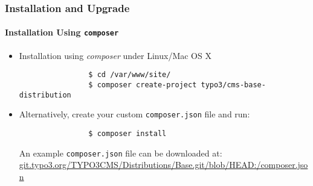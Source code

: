 \begin{frame}[fragile]
	\frametitle{Installation and Upgrade}
	\framesubtitle{Installation Using \texttt{composer}}

	\begin{itemize}
		\item Installation using \textit{composer} under Linux/Mac OS X

			\begin{lstlisting}
				$ cd /var/www/site/
				$ composer create-project typo3/cms-base-distribution
			\end{lstlisting}

		\item Alternatively, create your custom \texttt{composer.json} file and run:

			\begin{lstlisting}
				$ composer install
			\end{lstlisting}

			An example \texttt{composer.json} file can be downloaded at:\newline
			\small
				\href{https://git.typo3.org/TYPO3CMS/Distributions/Base.git/blob/HEAD:/composer.json}{git.typo3.org/TYPO3CMS/Distributions/Base.git/blob/HEAD:/composer.json}
			\normalsize


	\end{itemize}
\end{frame}

